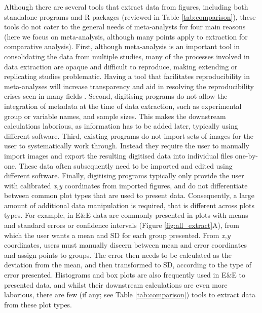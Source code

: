 \documentclass[12pt]{article}
\let\proglang=\textsf
\begin{document}
Although there are several tools that extract data from figures, including both standalone programs and \proglang{R} packages (reviewed in Table \ref{tab:comparison}), these tools do not cater to the general needs of meta-analysts for four main reasons (here we focus on meta-analysis, although many points apply to extraction for comparative analysis). First, although meta-analysis is an important tool in consolidating the data from multiple studies, many of the processes involved in data extraction are opaque and difficult to reproduce, making extending or replicating studies problematic. Having a tool that facilitates reproducibility in meta-analyses will increase transparency and aid in resolving the reproducibility crises seen in many fields \citep{peng_reproducible_2006, peng_reproducible_2011, Parker2016}. Second, digitising programs do not allow the integration of metadata at the time of data extraction, such as experimental group or variable names, and sample sizes. This makes the downstream calculations laborious, as information has to be added later, typically using different software. Third, existing programs do not import sets of images for the user to systematically work through. Instead they require the user to manually import images and export the resulting digitised data into individual files one-by-one. These data often subsequently need to be imported and edited using different software. Finally, digitising programs typically only provide the user with calibrated \textit{x,y} coordinates from imported figures, and do not differentiate between common plot types that are used to present data. Consequently, a large amount of additional data manipulation is required, that is different across plots types. For example, in E\&E data are commonly presented in plots with means and standard errors or confidence intervals (Figure \ref{fig:all_extract}A), from which the user wants a mean and SD for each group presented. From \textit{x,y} coordinates, users must manually discern between mean and error coordinates and assign points to groups. The error then needs to be calculated as the deviation from the mean, and then transformed to SD, according to the type of error presented. Histograms and box plots are also frequently used in E\&E to presented data, and whilst their downstream calculations are even more laborious, there are few (if any; see Table \ref{tab:comparison}) tools to extract data from these plot types.
\end{document}
